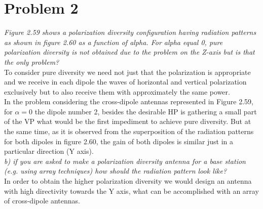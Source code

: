 \section{Problem 2}
\textit{Figure 2.59 shows a polarization diversity configuration having radiation patterns as shown in figure 2.60 as a function of alpha. For alpha equal 0, pure polarization diversity is not obtained due to the problem on the Z-axis but is that the only problem?}\\ 

To consider pure diversity we need not just that the polarization is appropriate and we receive in each dipole the waves of horizontal and vertical polarization exclusively but to also receive them with approximately the same power.\\

In the problem considering the cross-dipole antennas represented in Figure 2.59, for $\alpha=0$ the dipole number 2, besides the desirable HP is gathering a small part of the VP what would be the first impediment to achieve pure diversity. But at the same time, as it is observed from the superposition of the radiation patterns for both dipoles in figure 2.60, the gain of both dipoles is similar just in a particular direction (Y axis).\\

\textit{b) if you are asked to make a polarization diversity antenna for a base station (e.g. using array techniques) how should the radiation pattern look like?}\\

In order to obtain the higher polarization diversity we would design an antenna with high directivity towards the Y axis, what can be accomplished with an array of cross-dipole antennas.